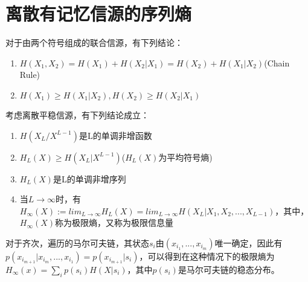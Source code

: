 \documentclass[a4paper, 12pt]{article}
\begin{document}
    \section{离散有记忆信源的序列熵}
    对于由两个符号组成的联合信源，有下列结论：  
    \begin{enumerate}
        \item $H(X_1, X_2) = H(X_1) + H(X_2|X_1) = H(X_2) + H(X_1|X_2)$(Chain Rule)
        \item $H(X_1)\ge H(X_1|X_2), H(X_2)\ge H(X_2|X_1)$
    \end{enumerate}
    考虑离散平稳信源，有下列结论成立：
    \begin{enumerate}
        \item $H(X_L/X^{L-1})$是L的单调非增函数
        \item $H_L(X)\ge H(X_L|X^{L-1})$($H_L(X)$为平均符号熵)
        \item $H_L(X)$是L的单调非增序列
        \item 当$L\rightarrow \infty$时，有$H_{\infty}(X) := lim_{L\rightarrow \infty}H_L(X)=lim_{L\rightarrow\infty}H(X_L|X_1,X_2,...,X_{L-1})$，其中，$H_{\infty}(X)$称为极限熵，又称为极限信息量
    \end{enumerate}
    对于齐次，遍历的马尔可夫链，其状态$s_i$由$(x_{i_1},...,x_{i_m})$唯一确定，因此有
    $p(x_{i_{m+1}}|x_{i_m},...,x_{i_1})=p(x_{i_{m+1}}|s_i)$，可以得到在这种情况下的极限熵为
    $H_{\infty}(x)=\sum_ip(s_i)H(X|s_i)$，其中$p(s_i)$是马尔可夫链的稳态分布。
\end{document}
